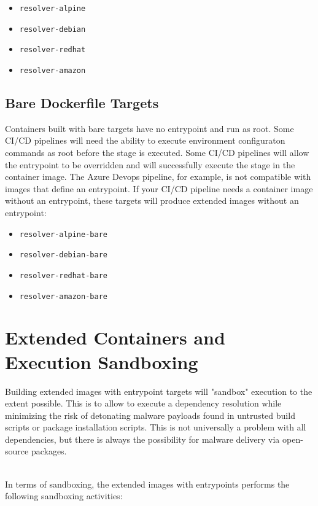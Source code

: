 \begin{itemize}
    \item \texttt{resolver-alpine}
    \item \texttt{resolver-debian}
    \item \texttt{resolver-redhat}
    \item \texttt{resolver-amazon}
\end{itemize}


\subsection{Bare Dockerfile Targets}\label{ssec:bare_targets}

Containers built with bare targets have no entrypoint and run as root.  
Some CI/CD pipelines will need the ability to execute environment
configuraton commands as root before the stage is executed.  Some CI/CD pipelines
will allow the entrypoint to be overridden and will successfully execute the stage
in the container image.  The Azure Devops pipeline, for example, is not compatible
with images that define an entrypoint.  If your CI/CD pipeline needs a container image without 
an entrypoint, these targets will
produce extended images without an entrypoint:

\begin{itemize}
    \item \texttt{resolver-alpine-bare}
    \item \texttt{resolver-debian-bare}
    \item \texttt{resolver-redhat-bare}
    \item \texttt{resolver-amazon-bare}
\end{itemize}


\section{Extended Containers and Execution Sandboxing}

Building extended images with entrypoint targets will "sandbox" \scaresolver execution 
to the extent possible. This is to allow \scaresolver to execute a dependency resolution
while minimizing the risk of detonating malware payloads found in untrusted build scripts or 
package installation scripts. This is not universally a problem with all dependencies, but 
there is always the possibility for malware delivery via open-source packages. 

\noindent\\In terms of sandboxing, the extended images with entrypoints performs the following sandboxing
activities:

